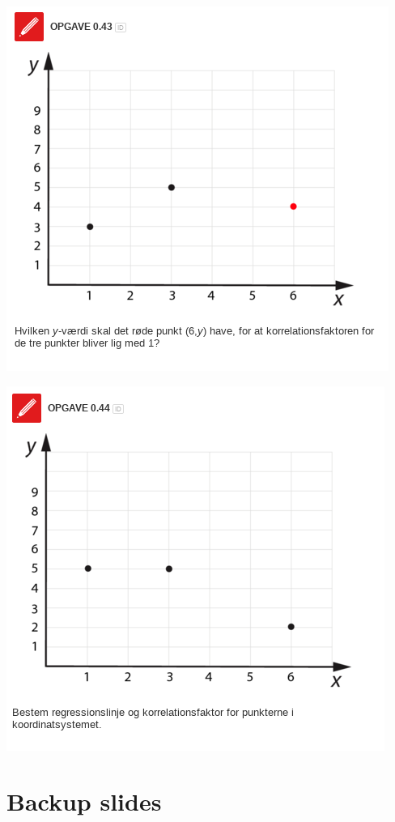 \documentclass[11pt]{article}
\begin{document}
\begin{center}
\includegraphics[width=.9\linewidth]{img/screenshot_2019-09-05_11-19-49.png}
\end{center}

\begin{center}
\includegraphics[width=.9\linewidth]{img/screenshot_2019-09-05_11-20-04.png}
\end{center}

\section*{Backup slides}
\label{sec:orga708c40}
\end{document}
